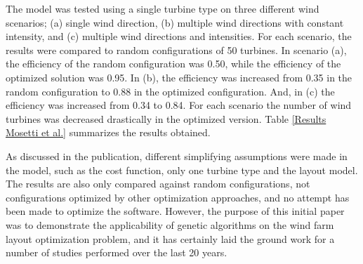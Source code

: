 \noindent The model was tested using a single turbine type on three different wind scenarios; (a) single wind direction, (b) multiple wind directions with constant intensity, and (c) multiple wind directions and intensities. For each scenario, the results were compared to random configurations of 50 turbines. In scenario (a), the efficiency of the random configuration was 0.50, while the efficiency of the optimized solution was 0.95. In (b), the efficiency was increased from 0.35 in the random configuration to 0.88 in the optimized configuration. And, in (c) the efficiency was increased from 0.34 to 0.84. For each scenario the number of wind turbines was decreased drastically in the optimized version. Table \ref{Results Mosetti et al.} summarizes the results obtained.

\begin{center}
\begin{table}[h!]
\caption{Optimized configurations compared against random configurations for each of the three scenarios (a) single wind direction, (b) multiple wind directions with constant intensity and (c) multiple wind directions and intensities{\citep{Mosetti}}.}
\label{Results Mosetti et al.}
\end{table}
\end{center}


\noindent As discussed in the publication, different simplifying assumptions were made in the model, such as the cost function, only one turbine type and the layout model. The results are also only compared against random configurations, not configurations optimized by other optimization approaches, and no attempt has been made to optimize the software. However, the purpose of this initial paper was to demonstrate the applicability of genetic algorithms on the wind farm layout optimization problem, and it has certainly laid the ground work for a number of studies performed over the last 20 years. \\


